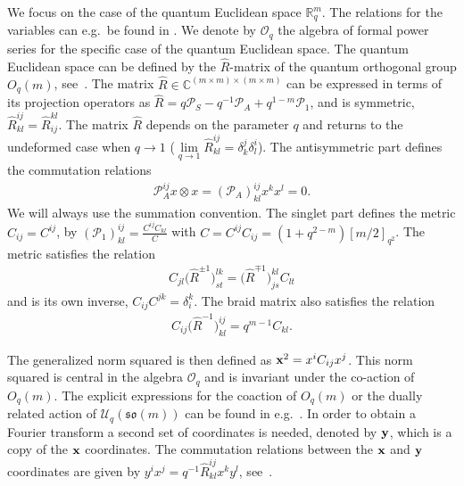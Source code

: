 \documentclass[pdftex]{sigma}
\newcommand{\mR}{\mathbb{R}}
\newcommand{\mC}{\mathbb{C}}
\newcommand{\cP}{\mathcal{P}}
\newcommand{\cO}{\mathcal{O}}
\newcommand{\cU}{\mathcal{U}}
\numberwithin{equation}{section}
\begin{document}
We focus on the case of the quantum Euclidean space $\mR^m_q$. The relations for the variables can e.g.\ be found in \cite{MR1328733, MR2006509, MR1361741}. We denote by $\cO_q$ the algebra of formal power series for the specif\/ic case of the quantum Euclidean space. The quantum Euclidean space can be def\/ined by the $\hat{R}$-matrix of the quantum orthogonal group $O_q(m)$, see~\cite{MR1097174, MR1239953}. The matrix $\hat{R}\in\mC^{(m\times m)\times(m\times m)}$ can be expressed in terms of its projection operators as $\hat{R}=q\cP_S-q^{-1}\cP_A+q^{1-m}\cP_1$, and is symmetric, $\hat{R}^{ij}_{kl}=\hat{R}_{ij}^{kl}$. The matrix $\hat{R}$ depends on the parameter $q$ and returns to the undeformed case when $q\to1$ ($\lim\limits_{q\to1}\hat{R}^{ij}_{kl}=\delta^j_k\delta^i_l$). The antisymmetric part def\/ines the commutation relations
\begin{gather*}
\cP_A^{ij}x\otimes x=\left(\cP_A\right)^{ij}_{kl}x^kx^l = 0.
\end{gather*}
We will always use the summation convention. The singlet part def\/ines the metric $C_{ij}=C^{ij}$, by $\left(\cP_1\right)^{ij}_{kl}=\frac{C^{ij}C_{kl}}{C}$ with $C=C^{ij}C_{ij}=(1+q^{2-m})[m/2]_{q^2}$. The metric satisf\/ies the relation
\begin{gather}
\label{CR}
C_{jl}\big(\hat{R}^{\pm 1}\big)^{lk}_{st} = \big(\hat{R}^{\mp 1}\big)^{kl}_{js}C_{lt}
\end{gather}
and is its own inverse, $C_{ij}C^{jk}=\delta^k_i$. The braid matrix also satisf\/ies the relation
\begin{gather}
\label{CR2}
C_{ij}\big(\hat{R}^{-1}\big)^{ij}_{kl} = q^{m-1}C_{kl}.
\end{gather}

The generalized norm squared is then def\/ined as $\bold{x}^2=x^iC_{ij}x^j$. This norm squared is central in the algebra $\cO_q$ and is invariant under the co-action of $O_q(m)$. The explicit expressions for the coaction of $O_q(m)$ or the dually related action of $\cU_q(\mathfrak{so}(m))$ can be found in e.g.~\cite{MR1138053, MR1239953, MR1328733, MR2006509}. In order to obtain a Fourier transform a second set of coordinates is needed, denoted by $\bold{y}$, which is a copy of the $\bold{x}$ coordinates. The commutation relations between the $\bold{x}$ and $\bold{y}$ coordinates are given by $y^ix^j=q^{-1}\hat{R}^{ij}_{kl}x^ky^l$, see~\cite{MR1303081, MR1235979, MR1317458}.
\end{document}
